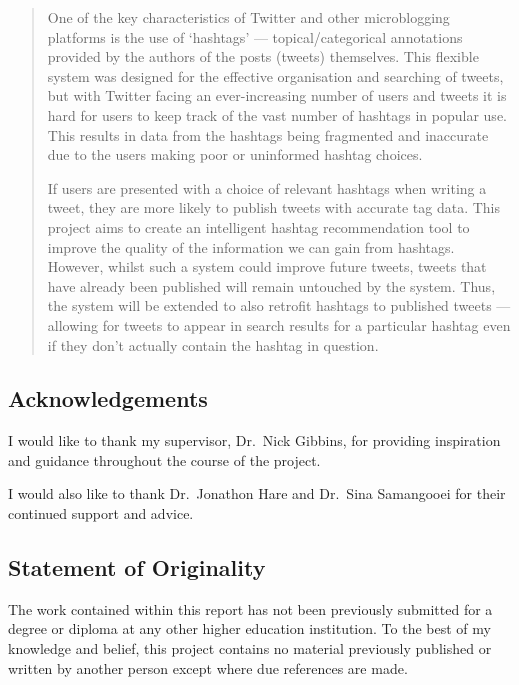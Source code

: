 \documentclass[11pt,a4paper]{report}
\begin{document}
\begin{abstract}
One of the key characteristics of Twitter and other microblogging platforms is the use of `hashtags' --- topical/categorical annotations provided by the authors of the posts (tweets) themselves. This flexible system was designed for the effective organisation and searching of tweets, but with Twitter facing an ever-increasing number of users and tweets it is hard for users to keep track of the vast number of hashtags in popular use. This results in data from the hashtags being fragmented and inaccurate due to the users making poor or uninformed hashtag choices.

If users are presented with a choice of relevant hashtags when writing a tweet, they are more likely to publish tweets with accurate tag data. This project aims to create an intelligent hashtag recommendation tool to improve the quality of the information we can gain from hashtags. However, whilst such a system could improve future tweets, tweets that have already been published will remain untouched by the system. Thus, the system will be extended to also retrofit hashtags to published tweets --- allowing for tweets to appear in search results for a particular hashtag even if they don't actually contain the hashtag in question.

\end{abstract}
\pagebreak

\tableofcontents

\pagebreak

\subsection*{Acknowledgements}
I would like to thank my supervisor, Dr.\ Nick Gibbins, for providing inspiration and guidance throughout the course of the project.

I would also like to thank Dr.\ Jonathon Hare and Dr.\ Sina Samangooei for their continued support and advice.

\subsection*{Statement of Originality}

The work contained within this report has not been previously submitted for a degree or diploma at any other higher education institution. To the best of my knowledge and belief, this project contains no material previously published or written by another person except where due references are made.
\end{document}
